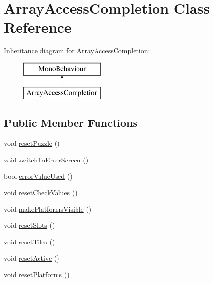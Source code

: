 \hypertarget{class_array_access_completion}{}\section{Array\+Access\+Completion Class Reference}
\label{class_array_access_completion}
Inheritance diagram for Array\+Access\+Completion\+:\begin{figure}[H]
\begin{center}
\leavevmode
\includegraphics[height=2.000000cm]{class_array_access_completion}
\end{center}
\end{figure}
\subsection*{Public Member Functions}
\begin{DoxyCompactItemize}
\item 
void \hyperlink{class_array_access_completion_a317a8a4cc02701f79003290ba3b00f02}{reset\+Puzzle} ()
\item 
void \hyperlink{class_array_access_completion_a46a4adc2ab93ea43fb9acb31a3770624}{switch\+To\+Error\+Screen} ()
\item 
bool \hyperlink{class_array_access_completion_a16f52bce4f85c9dc5e6f751531988bb0}{error\+Value\+Used} ()
\item 
void \hyperlink{class_array_access_completion_ac2350f79701c5e7a953e44e788347c6c}{reset\+Check\+Values} ()
\item 
void \hyperlink{class_array_access_completion_ac3834cd64df95140d0becf11f7eb15de}{make\+Platforms\+Visible} ()
\item 
void \hyperlink{class_array_access_completion_a7d73c45ea206180019c5cc0e7a73eb92}{reset\+Slots} ()
\item 
void \hyperlink{class_array_access_completion_a0975baec709eab99fa831cefd45a2069}{reset\+Tiles} ()
\item 
void \hyperlink{class_array_access_completion_ac8b88581ac5e6fe71128b6a4c5c64c12}{reset\+Active} ()
\item 
void \hyperlink{class_array_access_completion_af92ecc71a759308e06bf8b4d96ca3c78}{reset\+Platforms} ()
\end{DoxyCompactItemize}
